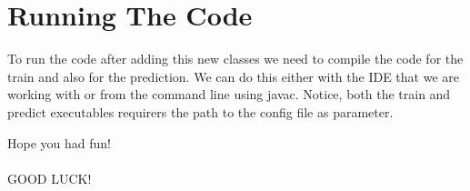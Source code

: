 \documentclass[11pt, oneside]{article}   	%
\begin{document}
\section{Running The Code}
To run the code after adding this new classes we need to compile the code for the train and also for the prediction. We can do this either with the IDE that we are working with or from the command line using javac.
Notice, both the train and predict executables requirers the path to the config file as parameter.

Hope you had fun!\\\\
GOOD LUCK! 
\end{document}

